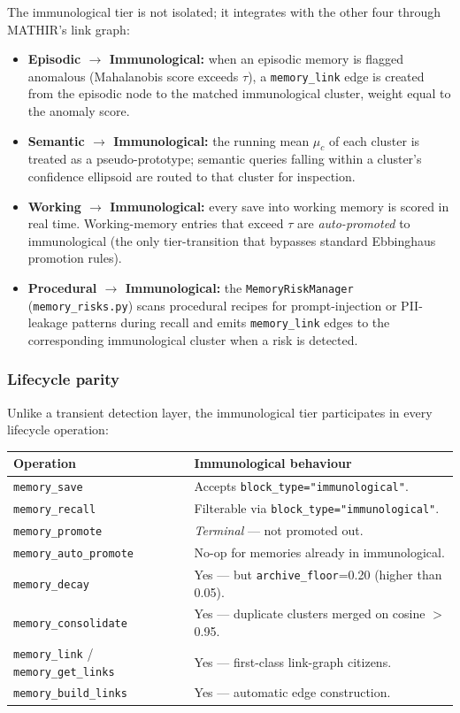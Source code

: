 \documentclass[12pt,a4paper]{article}
\theoremstyle{definition}
\theoremstyle{remark}
\begin{document}
The immunological tier is not isolated; it integrates with the other four through MATHIR's link graph:
\begin{itemize}
    \item \textbf{Episodic $\to$ Immunological:} when an episodic memory is flagged anomalous (Mahalanobis score exceeds $\tau$), a \texttt{memory\_link} edge is created from the episodic node to the matched immunological cluster, weight equal to the anomaly score.
    \item \textbf{Semantic $\to$ Immunological:} the running mean $\mu_c$ of each cluster is treated as a pseudo-prototype; semantic queries falling within a cluster's confidence ellipsoid are routed to that cluster for inspection.
    \item \textbf{Working $\to$ Immunological:} every save into working memory is scored in real time. Working-memory entries that exceed $\tau$ are \emph{auto-promoted} to immunological (the only tier-transition that bypasses standard Ebbinghaus promotion rules).
    \item \textbf{Procedural $\to$ Immunological:} the \texttt{MemoryRiskManager} (\texttt{memory\_risks.py}) scans procedural recipes for prompt-injection or PII-leakage patterns during recall and emits \texttt{memory\_link} edges to the corresponding immunological cluster when a risk is detected.
\end{itemize}

\subsubsection{Lifecycle parity}

Unlike a transient detection layer, the immunological tier participates in every lifecycle operation:

\begin{tabular}{ll}
\toprule
\textbf{Operation} & \textbf{Immunological behaviour} \\
\midrule
\texttt{memory\_save} & Accepts \texttt{block\_type="immunological"}. \\
\texttt{memory\_recall} & Filterable via \texttt{block\_type="immunological"}. \\
\texttt{memory\_promote} & \emph{Terminal} --- not promoted out. \\
\texttt{memory\_auto\_promote} & No-op for memories already in immunological. \\
\texttt{memory\_decay} & Yes --- but \texttt{archive\_floor}=0.20 (higher than 0.05). \\
\texttt{memory\_consolidate} & Yes --- duplicate clusters merged on cosine $>$ 0.95. \\
\texttt{memory\_link} / \texttt{memory\_get\_links} & Yes --- first-class link-graph citizens. \\
\texttt{memory\_build\_links} & Yes --- automatic edge construction. \\
\bottomrule
\end{tabular}
\end{document}
